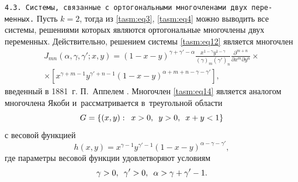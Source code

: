 \texttt{4.3. Системы, связанные с ортогональными многочленами двух пере-\linebreak менных.} 
Пусть $k=2$, тогда из \eqref{tasm:eq3}, \eqref{tasm:eq4} можно выводить все системы, решениями которых являются ортогональные многочлены двух переменных. 
Действительно, решением системы \eqref{tasm:eq12} является многочлен
\begin{multline}
J_{mn}(\alpha, \gamma, \gamma'; x,
y)=(1-x-y)^{\gamma+\gamma'-\alpha}    \displaystyle
\frac{x^{1-\gamma}    y^{1-\gamma}}{(\gamma)_{m}   
(\gamma')_{n}}    \frac{\partial^{m+n}}{\partial x^{m}\partial
y^{n}}  \times  \\
\times \left[x^{\gamma+m-1}   
y^{\gamma'+n-1}(1-x-y)^{\alpha+m+n-\gamma-\gamma'}\right],
\label{tasm:eq14}
\end{multline}
введенный в 1881~г. П.~Аппелем \cite{tasm:1}. 
Многочлен \eqref{tasm:eq14} является аналогом многочлена Якоби и~рассматривается в~треугольной области
$$G=\left\{ (x, y): \enskip x>0,\enskip y>0, \enskip   x+y<1 \right\}$$ с весовой функцией
$$
h(x,y)=x^{\gamma-1}    y^{\gamma'-1}(1-x-y)^{\alpha-\gamma-\gamma'} ,
$$
где параметры весовой функции удовлетворяют условиям 
$$\gamma>0,\enskip \gamma'>0,\enskip \alpha>\gamma+\gamma'-1.$$

\smallskip

